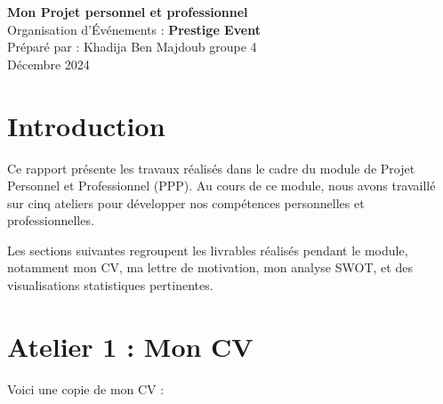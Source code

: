 \documentclass[a4paper,12pt]{article}
\begin{document}
\begin{titlepage}
    \centering
    {\LARGE \textbf{\color{myblue} Mon Projet personnel et professionnel}} \\[1cm]
    {\Large Organisation d'Événements : \textbf{\color{mypurple} Prestige Event}} \\[2cm]
    \vfill
    {\large Préparé par : Khadija Ben Majdoub groupe 4} \\[0.5cm]
    {\large Décembre 2024}
    \vfill
\end{titlepage}

\section*{\color{myblue} Introduction}
Ce rapport présente les travaux réalisés dans le cadre du module de Projet Personnel et Professionnel (PPP). Au cours de ce module, nous avons travaillé sur cinq ateliers pour développer nos compétences personnelles et professionnelles.  

Les sections suivantes regroupent les livrables réalisés pendant le module, notamment mon CV, ma lettre de motivation, mon analyse SWOT, et des visualisations statistiques pertinentes.

\section*{\color{mygreen} Atelier 1 : Mon CV}
Voici une copie de mon CV :  
\end{document}
